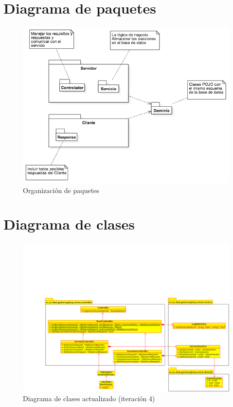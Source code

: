 \section{Diagrama de paquetes}
\begin{figure}[h]
 \includegraphics[scale=0.6]{diagrams/package_diagram.png}
 \caption{Organización de paquetes}
 \label{fig:paquetes}
\end{figure} 

\section{Diagrama de clases}
\begin{figure}[h]
 \includegraphics[scale=0.4]{diagrams/class_diagram_iter4.png}
 \caption{Diagrama de clases actualizado (iteración 4)}
 \label{fig:clases}
\end{figure}

